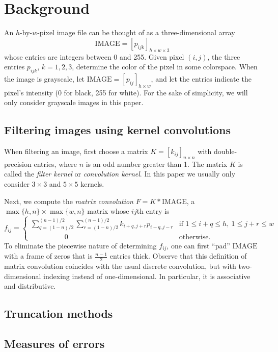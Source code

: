 \documentclass[12pt]{amsart}
\theoremstyle{definition}
\theoremstyle{remark}
\numberwithin{thm}{section}
\newcommand{\IMAGE}{\text{IMAGE}}
\begin{document}
\section{Background}

An $h$-by-$w$-pixel image file can be thought of as a three-dimensional array $$\IMAGE = \left[p_{ijk}\right]_{h\times w\times 3}$$ whose entries are integers between 0 and 255. Given pixel $(i,j)$, the three entries $p_{ijk}$, $k=1,2,3$, determine the color of the pixel in some colorspace. When the image is grayscale, let $\IMAGE = [p_{ij}]_{h\times w}$, and let the entries indicate the pixel's intensity (0 for black, 255 for white). For the sake of simplicity, we will only consider grayscale images in this paper.

\subsection{Filtering images using kernel convolutions}

When filtering an image, first choose a matrix $K = [k_{ij}]_{n\times n}$ with double-precision entries, where $n$ is an odd number greater than 1. The matrix $K$ is called the \emph{filter kernel} or \emph{convolution kernel}. In this paper we usually only consider $3\times3$ and $5\times5$ kernels.

Next, we compute the \emph{matrix convolution} $F = K * \IMAGE$,  a $\max\{h,n\}\times\max\{w,n\}$ matrix whose $ij$th entry is
\[f_{ij} = \begin{cases}
\displaystyle\sum_{q = (1-n)/2}^{(n-1)/2}\sum_{r = (1-n)/2}^{(n-1)/2}k_{i+q,j+r}p_{i-q,j-r} & \textrm{if } 1\le i+q \le h,\ 1 \le j+r \le w\\
\hspace{2cm} 0 & \textrm{otherwise}.
\end{cases}\]
To eliminate the piecewise nature of determining $f_{ij}$, one can first ``pad'' $\IMAGE$ with a frame of zeros that is $\frac{n-1}{2}$ entries thick. Observe that this definition of matrix convolution coincides with the usual discrete convolution, but with two-dimensional indexing instead of one-dimensional. In particular, it is associative and distributive.

\subsection{Truncation methods}
\subsection{Measures of errors}\label{subsec:measures}
\end{document}
